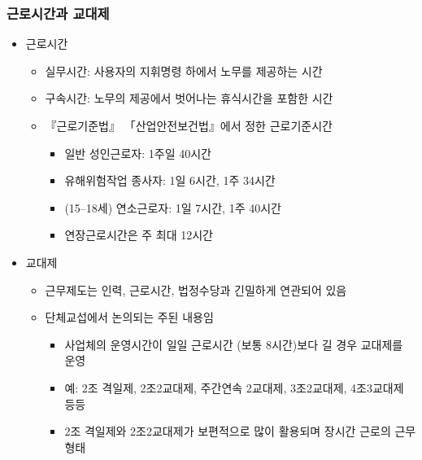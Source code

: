 \documentclass[aspectratio=169,xcolor=dvipsnames,handout]{beamer}
\begin{document}
\begin{frame}[allowframebreaks]
    \frametitle{근로시간과 교대제}
    \begin{itemize}
        \item 근로시간 
        \begin{itemize}[<+->]
            \item 실무시간: 사용자의 지휘명령 하에서 노무를 제공하는 시간
            \item 구속시간: 노무의 제공에서 벗어나는 휴식시간을 포함한 시간
            \item 『근로기준법』 「산업안전보건법』에서 정한 근로기준시간
            \begin{itemize}[<+->]
                \item 일반 성인근로자: 1주일 40시간
                \item 유해위험작업 종사자: 1일 6시간, 1주 34시간 
                \item (15--18세) 연소근로자: 1일 7시간, 1주 40시간
                \item 연장근로시간은 주 최대 12시간
            \end{itemize}
        \end{itemize}
    \framebreak\relax
    \item 교대제
        \begin{itemize}[<+->]
            \item 근무제도는 인력, 근로시간, 법정수당과 긴밀하게 연관되어 있음 
            \item 단체교섭에서 논의되는 주된 내용임
            \begin{itemize}[<+->]
                \item 사업체의 운영시간이 일일 근로시간 (보통 8시간)보다 길 경우 교대제를 운영 
                \item 예: 2조 격일제, 2조2교대제, 주간연속 2교대제, 3조2교대제, 4조3교대제 등등
                \item 2조 격일제와 2조2교대제가 보편적으로 많이 활용되며 장시간 근로의 근무형태
            \end{itemize}
        \end{itemize}
    \end{itemize}
\end{frame}
\end{document}
